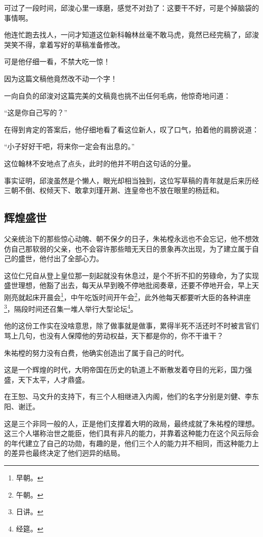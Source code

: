 \begin{multicols}{\theparacolNo}
		可过了一段时间，邱浚心里一琢磨，感觉不对劲了：这要干不好，可是个掉脑袋的事情啊。

		他连忙跑去找人，一问才知道这位新科翰林丝毫不敢马虎，竟然已经完稿了，邱浚哭笑不得，拿着写好的草稿准备修改。

		可是他仔细一看，不禁大吃一惊！

		因为这篇文稿他竟然改不动一个字！

		一向自负的邱浚对这篇完美的文稿竟也挑不出任何毛病，他惊奇地问道：

		“这是你自己写的？”

		在得到肯定的答案后，他仔细地看了看这位新人，叹了口气，拍着他的肩膀说道：

		“小子好好干吧，将来你一定会有出息的。”

		这位翰林不安地点了点头，此时的他并不明白这句话的分量。

		事实证明，邱浚虽然是个懒人，眼光却相当独到，这位写草稿的青年就是后来历经三朝不倒、权倾天下、敢拿刘瑾开涮、连皇帝也不放在眼里的杨廷和。

		\subsection{辉煌盛世}
		父亲统治下的那些惊心动魄、朝不保夕的日子，朱祐樘永远也不会忘记，他不想效仿自己那软弱的父亲，也不会容许那些暗无天日的景象再次出现，为了建立属于自己的盛世，他付出了全部心力。

		这位仁兄自从登上皇位那一刻起就没有休息过，是个不折不扣的劳碌命，为了实现盛世理想，他豁了出去，每天从早到晚不停地批阅奏章，还要不停地开会，早上天刚亮就起床开晨会\footnote{早朝。}，中午吃饭时间开午会\footnote{午朝。}，此外他每天都要听大臣的各种讲座\footnote{日讲。}，隔段时间还召集一堆人举行大型论坛\footnote{经筵。}。

		他的这份工作实在没啥意思，除了做事就是做事，累得半死不活还时不时被言官们骂上几句，也没有人保障他的劳动权益，天下都是你的，你不干谁干？

		朱祐樘的努力没有白费，他确实创造出了属于自己的时代。

		这是一个辉煌的时代，大明帝国在历史的轨道上不断散发着夺目的光彩，国力强盛，天下太平，人才鼎盛。

		在王恕、马文升的支持下，有三个人相继进入内阁，他们的名字分别是刘健、李东阳、谢迁。

		这是三个非同一般的人，正是他们支撑着大明的政局，最终成就了朱祐樘的理想。这三个人堪称治世之能臣，他们具有非凡的能力，并靠着这种能力在这个风云际会的年代建立了自己的功勋，有趣的是，他们三个人的能力并不相同，而这种能力上的差异也最终决定了他们迥异的结局。


\end{multicols}
